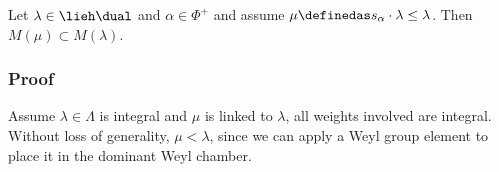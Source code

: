 \begin{description}
\tightlist
\item[Theorem (Verma's Thesis: Existence of Embeddings)]
Let \(\lambda \in \lieh\dual\) and \(\alpha\in\Phi^+\) and assume
\(\mu \definedas s_\alpha \cdot \lambda \leq \lambda\). Then
\(M(\mu) \subset M(\lambda)\).
\end{description}

\hypertarget{proof}{%
\subsubsection{Proof}\label{proof}}

Assume \(\lambda \in \Lambda\) is integral and \(\mu\) is linked to
\(\lambda\), all weights involved are integral. Without loss of
generality, \(\mu < \lambda\), since we can apply a Weyl group element
to place it in the dominant Weyl chamber.


